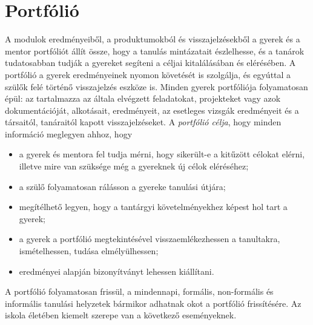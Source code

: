 \section{Portfólió}
\label{sec:portfolio}
A modulok eredményeiből, a produktumokból és visszajelzésekből a gyerek és a mentor portfóliót állít össze, hogy a tanulás mintázatait észlelhesse, és a tanárok tudatosabban tudják a gyereket segíteni a céljai kitalálásában és elérésében. A portfólió a gyerek eredményeinek nyomon követését is szolgálja, és egyúttal a szülők felé történő visszajelzés eszköze is. Minden gyerek portfóliója folyamatosan épül: az tartalmazza az általa elvégzett feladatokat, projekteket vagy azok dokumentációját, alkotásait, eredményeit, az esetleges vizsgák eredményeit és a társaitól, tanáraitól kapott visszajelzéseket. A \emph{portfólió célja}, hogy minden információ meglegyen ahhoz, hogy

\begin{itemize}
      \item a gyerek és mentora fel tudja mérni, hogy sikerült-e a kitűzött célokat elérni, illetve mire van szüksége még a gyereknek új célok eléréséhez;

      \item a szülő folyamatosan rálásson a gyereke tanulási útjára;

      \item megítélhető legyen, hogy a tantárgyi követelményekhez képest hol tart a gyerek;

      \item a gyerek a portfólió megtekintésével visszaemlékezhessen a tanultakra, ismételhessen, tudása elmélyülhessen;

      \item eredményei alapján bizonyítványt lehessen kiállítani.

\end{itemize}

A portfólió folyamatosan frissül, a mindennapi, formális, non-formális és informális tanulási helyzetek bármikor adhatnak okot a portfólió frissítésére. Az iskola életében kiemelt szerepe van a következő eseményeknek.

